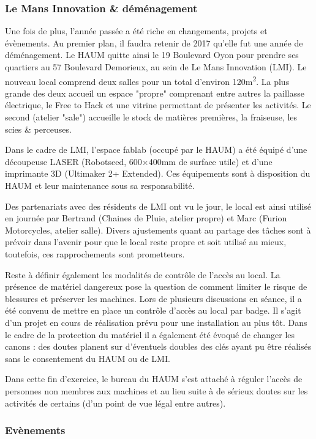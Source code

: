 \documentclass[11pt]{article}
\begin{document}
\subsubsection{Le Mans Innovation \& déménagement}
Une fois de plus, l'année passée a été riche en changements, projets et évènements. Au
premier plan, il faudra retenir de 2017 qu'elle fut une année de déménagement. Le HAUM
quitte ainsi le 19 Boulevard Oyon pour prendre ses quartiers au 57 Boulevard Demorieux, au
sein de Le Mans Innovation (LMI).
Le nouveau local comprend deux salles pour un total d'environ 120m\textsuperscript{2}. La
plus grande des deux accueil un espace "propre" comprenant entre autres la paillasse
électrique, le Free to Hack et une vitrine permettant de présenter les activités. Le
second (atelier "sale") accueille le stock de matières premières, la fraiseuse, les scies
\& perceuses.

Dans le cadre de LMI, l'espace fablab (occupé par le HAUM) a été équipé
d'une découpeuse LASER (Robotseed, 600$\times$400mm de surface utile) et d'une imprimante 3D
(Ultimaker 2+ Extended). Ces équipements sont à disposition du HAUM et leur maintenance
sous sa responsabilité.

Des partenariats avec des résidents de LMI ont vu le jour, le local est ainsi utilisé en
journée par Bertrand (Chaines de Pluie, atelier propre) et Marc (Furion Motorcycles,
atelier salle). Divers ajustements quant au partage des tâches sont à prévoir dans
l'avenir pour que le local reste propre et soit utilisé au mieux, toutefois, ces
rapprochements sont prometteurs.

Reste à définir également les modalités de contrôle de l'accès au local. La présence de
matériel dangereux pose la question de comment limiter le risque de blessures et préserver
les machines. Lors de plusieurs discussions en séance, il a été convenu de mettre en place
un contrôle d'accès au local par badge. Il s'agit d'un projet en cours de réalisation
prévu pour une installation au plus tôt. Dans le cadre de la protection du matériel il a
également été évoqué de changer les canons : des doutes planent sur d'éventuels doubles
des clés ayant pu être réalisés sans le consentement du HAUM ou de LMI.

Dans cette fin d'exercice, le bureau du HAUM s'est attaché à réguler l'accès de personnes
non membres aux machines et au lieu suite à de sérieux doutes sur les activités de
certains (d'un point de vue légal entre autres).

\subsubsection{Evènements}
\end{document}
